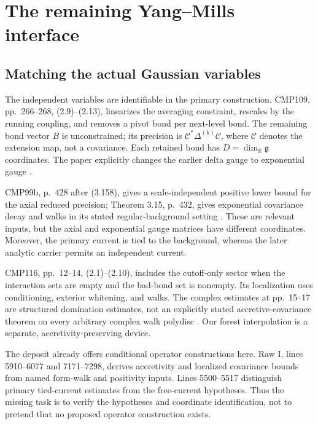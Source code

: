 \documentclass[11pt]{article}
\theoremstyle{remark}
\newcommand{\R}{\mathbb R}
\begin{document}
\section{The remaining Yang--Mills interface}

\subsection{Matching the actual Gaussian variables}

The independent variables are identifiable in the primary construction.
CMP109, pp.\ 266--268, (2.9)--(2.13), linearizes the averaging
constraint, rescales by the running coupling, and removes a pivot bond
per next-level bond. The remaining bond vector $B$ is unconstrained;
its precision is $\mathcal C^*\Delta^{(k)}\mathcal C$, where
$\mathcal C$ denotes the extension map, not a covariance. Each retained
bond has $D=\dim_\R\mathfrak g$ coordinates. The paper explicitly
changes the earlier delta gauge to exponential gauge
\cite{balaban109}.

CMP99b, p.\ 428 after (3.158), gives a scale-independent positive lower
bound for the axial reduced precision; Theorem 3.15, p.\ 432, gives
exponential covariance decay and walks in its stated regular-background
setting \cite{balaban99}. These are relevant inputs, but the axial and
exponential gauge matrices have different coordinates. Moreover,
the primary current is tied to the background, whereas the later
analytic carrier permits an independent current.

CMP116, pp.\ 12--14, (2.1)--(2.10), includes the cutoff-only sector
when the interaction sets are empty and the bad-bond set is nonempty.
Its localization uses conditioning, exterior whitening, and walks.
The complex estimates at pp.\ 15--17 are structured domination
estimates, not an explicitly stated accretive-covariance theorem on
every arbitrary complex walk polydisc \cite{balaban116}.
Our forest interpolation is a separate, accretivity-preserving device.

The deposit already offers conditional operator constructions here.
Raw I, lines 5910--6077 and 7171--7298, derives accretivity and
localized covariance bounds from named form-walk and positivity
inputs. Lines 5500--5517 distinguish primary tied-current estimates
from the free-current hypotheses. Thus the missing task is to verify
the hypotheses and coordinate identification, not to pretend that
no proposed operator construction exists.
\end{document}
